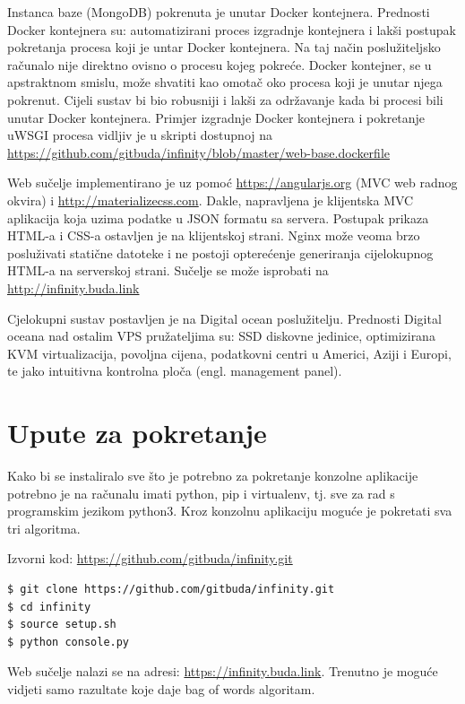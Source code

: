 \documentclass[a4paper,12pt]{article}
\begin{document}
\vspace{0.3cm}

Instanca baze (MongoDB) pokrenuta je unutar Docker kontejnera. Prednosti Docker kontejnera su: automatizirani proces izgradnje kontejnera i lakši postupak pokretanja procesa koji je untar Docker kontejnera. Na taj način poslužiteljsko računalo nije direktno ovisno o procesu kojeg pokreće. Docker kontejner, se  u apstraktnom smislu, može shvatiti kao omotač oko procesa koji je unutar njega pokrenut. Cijeli sustav bi bio robusniji i lakši za održavanje kada bi procesi bili unutar Docker kontejnera. Primjer izgradnje Docker kontejnera i pokretanje uWSGI procesa vidljiv je u skripti dostupnoj na \url{https://github.com/gitbuda/infinity/blob/master/web-base.dockerfile}

Web sučelje implementirano je uz pomoć \url{https://angularjs.org} (MVC web radnog okvira) i \url{http://materializecss.com}. Dakle, napravljena je klijentska MVC aplikacija koja uzima podatke u JSON formatu sa servera. Postupak prikaza HTML-a i CSS-a ostavljen je na klijentskoj strani. Nginx može veoma brzo posluživati statične datoteke i ne postoji opterećenje generiranja cijelokupnog HTML-a na serverskoj strani. Sučelje se može isprobati na \url{http://infinity.buda.link}

Cjelokupni sustav postavljen je na Digital ocean poslužitelju. Prednosti Digital oceana nad ostalim VPS pružateljima su: SSD diskovne jedinice, optimizirana KVM virtualizacija, povoljna cijena, podatkovni centri u Americi, Aziji i Europi, te jako intuitivna kontrolna ploča (engl. management panel).

\section{Upute za pokretanje}

Kako bi se instaliralo sve što je potrebno za pokretanje konzolne aplikacije potrebno je na računalu imati python, pip i virtualenv, tj. sve za rad s programskim jezikom python3. Kroz konzolnu aplikaciju moguće je pokretati sva tri algoritma.

Izvorni kod: \url{https://github.com/gitbuda/infinity.git}

\begin{lstlisting}[language=bash]
$ git clone https://github.com/gitbuda/infinity.git
$ cd infinity
$ source setup.sh
$ python console.py
\end{lstlisting}

Web sučelje nalazi se na adresi: \url{https://infinity.buda.link}. Trenutno je moguće vidjeti samo razultate koje daje bag of words algoritam.
\end{document}
